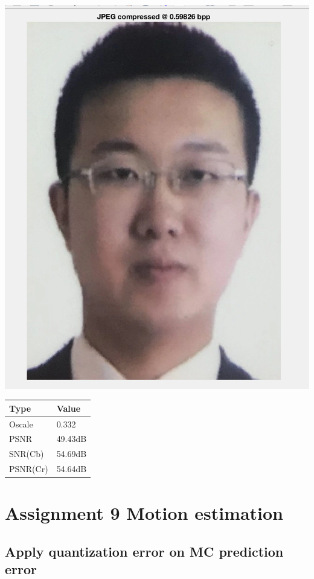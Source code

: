 \documentclass[titlepage]{article}
\begin{document}
\begin{center}
\includegraphics[width=.9\linewidth]{./img/p6_332.png}
\end{center}

\begin{center}
\begin{tabular}{ll}
Type & Value\\
\hline
Oscale & 0.332\\
PSNR & 49.43dB\\
SNR(Cb) & 54.69dB\\
PSNR(Cr) & 54.64dB\\
\end{tabular}
\end{center}




\section{Assignment 9 Motion estimation}
\label{sec:org58c0bb0}
\subsection{Apply quantization error on MC prediction error}
\label{sec:org366c6f5}
\end{document}
